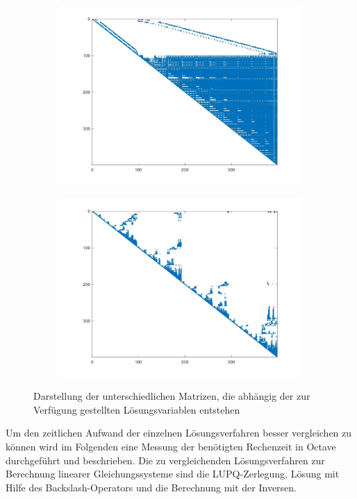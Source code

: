 \begin{figure}[h!]
\begin{subfigure}[h]{.48\textwidth}
		\includegraphics[width=\textwidth]{data/ULU}
		\label{fig:ULU}
	\end{subfigure}
	\begin{subfigure}[h]{.48\textwidth}
		\centering
		\includegraphics[width=\textwidth,]{data/ULUPQ}
		\label{fig:ULUPQ}
	\end{subfigure}\hspace{40pt}
\caption{Darstellung der unterschiedlichen Matrizen, die abhängig der zur Verfügung gestellten Lösungsvariablen entstehen}
\end{figure}
Um den zeitlichen Aufwand der einzelnen Lösungsverfahren besser vergleichen zu können wird im Folgenden eine Messung der benötigten Rechenzeit in Octave durchgeführt und beschrieben. Die zu vergleichenden Lösungsverfahren zur Berechnung linearer Gleichungssysteme sind die LUPQ-Zerlegung, Lösung mit Hilfe des Backslash-Operators und die Berechnung mit der Inversen.\\ \\
